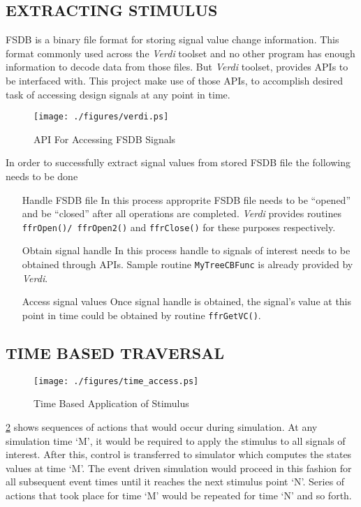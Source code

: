 \subsection{EXTRACTING STIMULUS}
FSDB is a binary file format for storing signal value change information. This format commonly used across the {\it Verdi} toolset and no other program has enough information to decode data from those files. But {\it Verdi} toolset, provides APIs\cite{Verdi:FsdbReader}  to be interfaced with. This project make use of those APIs, to accomplish desired task of accessing design signals at any point in time.

\begin{figure}[h]
\centering
\texttt{[image: ./figures/verdi.ps]}
\caption{API For Accessing FSDB Signals}
\label{fig:verdi.eps}
\end{figure}

In order to successfully extract signal values from stored FSDB file the following needs to be done
\begin{enumerate}
\item[Handle FSDB file] In this process approprite FSDB file needs to be ``opened'' and be ``closed'' after all operations are completed. {\it Verdi} provides routines \texttt{ffrOpen()/ ffrOpen2()} and \texttt{ffrClose()} for these purposes respectively.
\item[Obtain signal handle] In this process handle to signals of interest needs to be obtained through APIs. Sample routine \texttt{MyTreeCBFunc}\cite[p.~3]{Verdi:FsdbReader} is already provided by {\it Verdi}.
\item[Access signal values] Once signal handle is obtained, the signal's value at this point in time could be obtained by routine \texttt{ffrGetVC()}.
\end{enumerate}

\subsection{TIME BASED TRAVERSAL}
\begin{figure}[h]
\centering
\texttt{[image: ./figures/time\_access.ps]}
\caption{Time Based Application of Stimulus}
\label{fig:dualsim:tbas}
\end{figure}

\figurename{\ref{fig:dualsim:tbas}} shows sequences of actions that would occur during simulation. At any simulation time `M', it would be required to apply the stimulus to all signals of interest. After  this, control is transferred to simulator which computes  the states values at time `M'. The event driven simulation  would proceed in this fashion for all subsequent event times until it reaches the next stimulus point `N'. Series of actions that took place for time `M' would be repeated for time `N'  and so forth.

